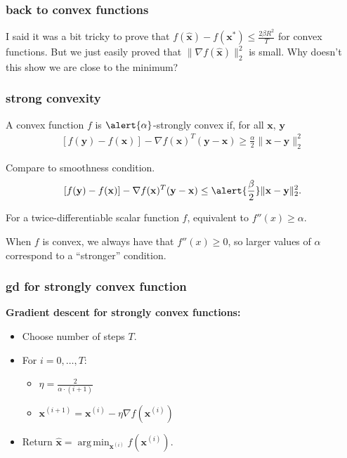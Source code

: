 \documentclass[compress]{beamer}
\newcommand{\bv}[1]{\mathbf{#1}}
\DeclareMathOperator*{\argmin}{arg\,min}
\begin{document}
\begin{frame}[t]
	\frametitle{back to convex functions}
	I said it was a bit tricky to prove that $f(\hat{\bv{x}}) - f(\bv{x}^*) \leq \frac{2\beta R^2}{T}$ for convex functions. But we just easily proved that $\|\nabla f(\hat{\bv{x}})\|_2^2$ is small. Why doesn't this show we are close to the minimum?
	
\end{frame}

\begin{frame}[t]
	\frametitle{strong convexity}
	\begin{definition}
		A convex function $f$ is $\alert{\alpha}$-strongly convex if, for all $\bv{x}$, $\bv{y}$
		\begin{align*}
			\left[f(\bv{y}) - f(\bv{x})\right] - \nabla f(\bv{x})^T(\bv{y} - \bv{x}) \geq \frac{\alpha}{2}\|\bv{x} - \bv{y}\|_2^2 
		\end{align*}
	\end{definition}
	Compare to smoothness condition.
	$$\left[f(\bv{y}) - f(\bv{x})\right] - \nabla f(\bv{x})^T(\bv{y} - \bv{x}) \leq \alert{\frac{\beta}{2}}\|\bv{x} - \bv{y}\|_2^2.$$
	
	\vspace{1em}
	For a twice-differentiable scalar function $f$, equivalent to $f''(x) \geq \alpha$.  
	
	\vspace{1em}
	When $f$ is convex, we always have that $f''(x)\geq 0$, so larger values of $\alpha$ correspond to a ``stronger'' condition.
\end{frame}



\begin{frame}[t]
	\frametitle{gd for strongly convex function}
	\textbf{Gradient descent for strongly convex functions:}
	\begin{itemize}
		\item Choose number of steps $T$.
		\item For $i = 0,\ldots, T$:
		\begin{itemize}
			\item $\eta = \frac{2}{\alpha\cdot(i+1)}$
			\item $\bv{x}^{(i+1)} = \bv{x}^{(i)} - \eta \nabla f(\bv{x}^{(i)})$
		\end{itemize}
		\item Return $\hat{\bv{x}} = \argmin_{\bv{x}^{(i)}} f(\bv{x}^{(i)})$. 
	\end{itemize}
\end{frame}
\end{document}
